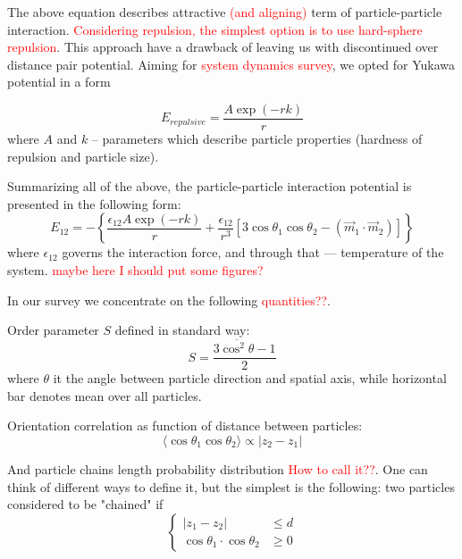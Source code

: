 \documentclass[12pt,a4paper]{article}
\begin{document}
The above equation describes attractive \textcolor{red}{(and aligning)} term of particle-particle interaction. \textcolor{red}{Considering repulsion, the simplest option is to use hard-sphere repulsion}. This approach have a drawback of leaving us with discontinued over distance pair potential. Aiming for \textcolor{red}{system dynamics survey}, we opted for Yukawa potential in a form

\label{eq_yukawa_interaction}
\begin{equation}
E_{repulsive} = \frac{A \exp(-r k)}{r}
\end{equation}
where $A$ and $k$ -- parameters which describe particle properties (hardness of repulsion and particle size).

Summarizing all of the above, the particle-particle interaction potential is presented in the following form:
\label{eq_full_particle_particle_interraction}
\begin{equation}
E_{12} = -\left\{ \frac{\epsilon_{12} A \exp(-r k)}{r} +  \frac{\epsilon_{12}}{r^3} [3 \cos \theta_1 \cos \theta_2 - (\vec{m}_1 \cdot \vec{m}_2)]\right\}
\end{equation}
where $\epsilon_{12}$ governs the interaction force, and through that --- temperature of the system. \textcolor{red}{maybe here I should put some figures?}

In our survey we concentrate on the following \textcolor{red}{quantities??}.

Order parameter $S$ defined in standard way:
\begin{equation}
S = \frac{3 \overline{\cos^2 \theta} - 1}{2}
\end{equation}
where $\theta$ it the angle between particle direction and spatial axis, while horizontal bar denotes mean over all particles.

Orientation correlation as function of distance between particles:
\begin{equation}
\langle\cos \theta_1 \cos \theta_2\rangle \propto |z_2 - z_1|
\end{equation}

And particle chains length probability distribution \textcolor{red}{How to call it??}. One can think of different ways to define it, but the simplest is the following: two particles considered to be "chained" if 
\begin{equation}
\begin{cases}
	|z_1 - z_2| &\leq d\\
	\cos \theta_1 \cdot \cos \theta_2 &\geq 0
\end{cases}
\end{equation}
\end{document}
